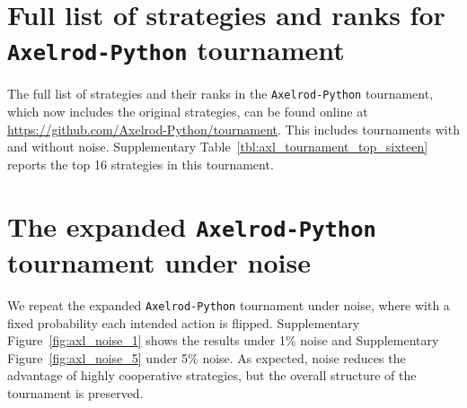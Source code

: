 \documentclass{article}
\newcommand{\AXL}{\texttt{Axelrod-Python}}
\begin{document}
\begin{table}[!hbtp]
        \resizebox{\textwidth}{.5\textheight}{
        \centering
        }
        \caption{Stewart and Plotkin tournament full list of rankings.}
        \label{tbl:sp_tournament_full_rankings}
\end{table}


\section{Full list of strategies and ranks for \AXL{} tournament}\label{app:axl}

The full list of strategies and their ranks in the \AXL{} tournament, which now
includes the original strategies, can be found online at
\url{https://github.com/Axelrod-Python/tournament}.
This includes tournaments with and without noise.
Supplementary Table~\ref{tbl:axl_tournament_top_sixteen} reports the top 16
strategies in this tournament.

\begin{table}[!hbtp]
    \centering
    \resizebox{.9\textwidth}{!}{
    }
    \caption{\textbf{Top 16 strategies in the \AXL{} tournament.} This
    tournament includes all strategies from the \AXL{} library alongside the
    original Fortran strategies. In total, there are 272 strategies competing.
    Strategies denoted by $^\dagger$ were not designed but, they were trained
    via reinforcement learning, as described in~\cite{Harper2017}.}
    \label{tbl:axl_tournament_top_sixteen}
\end{table}


\section{The expanded \AXL{} tournament under noise}\label{app:axl_noise}

We repeat the expanded \AXL{} tournament under noise, where with a fixed
probability each intended action is flipped. Supplementary
Figure~\ref{fig:axl_noise_1} shows the results under 1\% noise and
Supplementary Figure~\ref{fig:axl_noise_5} under 5\% noise. As expected, noise
reduces the advantage of highly cooperative strategies, but the overall
structure of the tournament is preserved.
\end{document}
